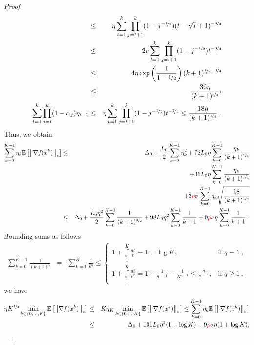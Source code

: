 \documentclass{article}
\begin{document}
\begin{proof}
\begin{eqnarray*}
        &\le& \eta \sum_{t=1}^k \prod_{j=t+1}^{k}(1-j^{-\nicefrac{1}{2}}) (t-\sqrt{t}+1)^{-\nicefrac{3}{4}} \\
        &\le& 2\eta \sum_{t=1}^k \prod_{j=t+1}^{k}(1-j^{-\nicefrac{1}{2}}) t^{-\nicefrac{3}{4}} \\
        &\le& 4\eta\exp\left(\frac{1}{1-\nicefrac{1}{2}}\right) (k+1)^{\nicefrac{1}{2} - \nicefrac{3}{4}}\\
        &\le& \frac{36\eta}{(k+1)^{\nicefrac{1}{4}}};\\
    \sum_{t=1}^k \prod_{j=t}^{k}(1-\alpha_j)\eta_{t-1} &\leq& \eta \sum_{t=1}^k \prod_{j=t+1}^{k}(1-j^{-\nicefrac{1}{2}})  t^{-\nicefrac{3}{4}}
        \le \frac{18\eta}{(k+1)^{\nicefrac{1}{4}}} ~.
\end{eqnarray*}
% 
Thus, we obtain
\begin{eqnarray*}
    \sum_{k=0}^{K-1} \eta_k {\mathbb{E}}\left[\left\| \nabla f(x^k) \right\|_*\right] &\le& \Delta_0  +\frac{L_0}{2}\sum^{K-1}_{k=0}\eta_k^2 + 72L_0\eta\sum^{K-1}_{k=0}\frac{\eta_k}{(k+1)^{\nicefrac{1}{4}}}\\
    && + 36L_0\eta\sum^{K-1}_{k=0}\frac{\eta_k}{(k+1)^{\nicefrac{1}{4}}}\\
    && + 2{\color{red} \rho} \sigma\sum^{K-1}_{k=0}\eta_k\sqrt{\frac{18}{(k+1)^{\nicefrac{1}{2}}}}\\
    &\le& \Delta_0  +\frac{L_0\eta^2}{2}\sum^{K-1}_{k=0}\frac{1}{(k+1)^{\nicefrac{3}{2}}} + 98 L_0\eta^2 \sum^{K-1}_{k=0}\frac{1}{k+1} + 9 {\color{red} \rho} \sigma \eta \sum^{K-1}_{k=0}\frac{1}{k+1} ~.
\end{eqnarray*}
% 
Bounding sums as follows 
\begin{eqnarray*}
    \sum^{K-1}_{k = 0} \frac{1}{(k+1)^q} &=& \sum^{K}_{k = 1}  \frac{1}{k^q} \le \begin{cases}
        1 + \int\limits^{K}_1 \frac{dt}{t} = 1+  \log K, & \text{if } q =1 \ , \\ 
        1 + \int\limits^{K}_1 \frac{dt}{t^q} = 1+  \frac{1}{q-1} - \frac{1}{K^{q-1}} \leq \frac{q}{q-1}, & \text{if } q \geq 1 \ ,
    \end{cases}
\end{eqnarray*}
we have 
\begin{eqnarray*}
    \eta K^{\nicefrac{1}{4}}\min_{k \in \{0, \dots, K\}}\Exp{\norm{\nabla f(x^k)}_*} &\le& K\eta_K \min_{k \in \{0, \dots, K\}}\Exp{\norm{\nabla f(x^k)}_*} \le \sum_{k=0}^{K-1} \eta_k \Exp{\norm{\nabla f(x^k)}_*} \\
    &\le& \Delta_0   + 101 L_0\eta^2 (1+\log K) + 9 {\color{red} \rho} \sigma \eta (1+\log K) ,

\end{eqnarray*}
\end{proof}
\end{document}
